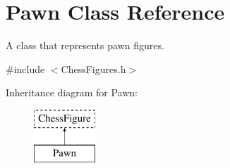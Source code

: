 \hypertarget{classPawn}{}\section{Pawn Class Reference}
\label{classPawn}


A class that represents pawn figures.  




{\ttfamily \#include $<$Chess\+Figures.\+h$>$}

Inheritance diagram for Pawn\+:\begin{figure}[H]
\begin{center}
\leavevmode
\includegraphics[height=2.000000cm]{classPawn}
\end{center}
\end{figure}
